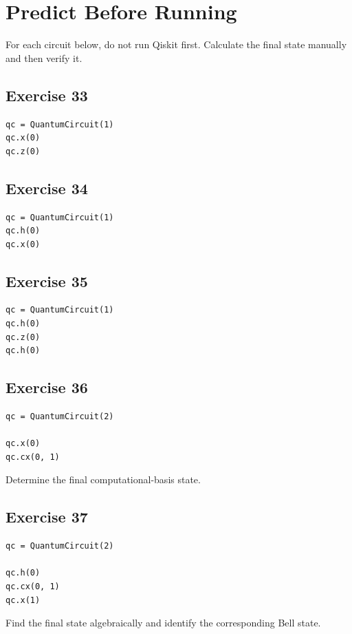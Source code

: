 \documentclass[12pt,a4paper]{article}
\begin{document}
\section{Predict Before Running}

For each circuit below, do not run Qiskit first. Calculate the final state manually and then verify it.

\subsection*{Exercise 33}
\begin{lstlisting}
qc = QuantumCircuit(1)
qc.x(0)
qc.z(0)
\end{lstlisting}

\subsection*{Exercise 34}
\begin{lstlisting}
qc = QuantumCircuit(1)
qc.h(0)
qc.x(0)
\end{lstlisting}

\subsection*{Exercise 35}
\begin{lstlisting}
qc = QuantumCircuit(1)
qc.h(0)
qc.z(0)
qc.h(0)
\end{lstlisting}

\subsection*{Exercise 36}
\begin{lstlisting}
qc = QuantumCircuit(2)

qc.x(0)
qc.cx(0, 1)
\end{lstlisting}

Determine the final computational-basis state.

\subsection*{Exercise 37}
\begin{lstlisting}
qc = QuantumCircuit(2)

qc.h(0)
qc.cx(0, 1)
qc.x(1)
\end{lstlisting}

Find the final state algebraically and identify the corresponding Bell state.
\end{document}
